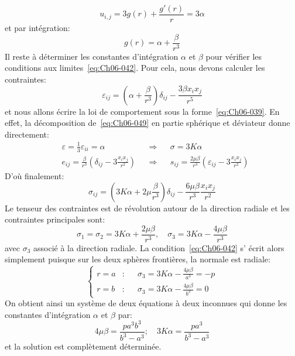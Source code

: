 \begin{equation}
    u_{i,j} = 3 g(r) + \frac{g'(r)}{r} = 3 \alpha
    \label{eq:Ch06-047}
\end{equation}
et par intégration:
\begin{equation}
    g(r) = \alpha + \frac{\beta}{r^3}
    \label{eq:Ch06-048}
\end{equation}
Il reste à déterminer les constantes d'intégration $\alpha$ et $\beta$ pour vérifier les conditions aux limites~\eqref{eq:Ch06-042}.
Pour cela, nous devons calculer les contraintes:
\begin{equation}
    \varepsilon_{ij} = \left( \alpha + \frac{\beta}{r^3} \right)\delta_{ij} - \frac{3\beta x_i x_j}{r^5}
    \label{eq:Ch06-049}
\end{equation}
et nous allons écrire la loi de comportement sous la forme~\eqref{eq:Ch06-039}.
En effet, la décomposition de~\eqref{eq:Ch06-049} en partie sphérique et déviateur donne directement:
\begin{equation}
    \begin{aligned}
        &\varepsilon = \frac{1}{3} \varepsilon_{ii} = \alpha && \Rightarrow && \sigma = 3K  \alpha \\
        &e_{ij} = \frac{\beta}{r^3} \left( \delta_{ij} - 3 \frac{x_ix_j}{r^2} \right) && \Rightarrow && s_{ij} = \frac{2\mu\beta}{r^3} \left( \varepsilon_{ij} - 3 \frac{x_i x_j}{r^2} \right)
    \end{aligned}
    \label{eq:Ch06-050}
\end{equation}
D'où finalement:
\begin{equation}
    \sigma_{ij} = \left( 3K\alpha + 2\mu \frac{\beta}{r^3} \right) \delta_{ij} - \frac{6\mu\beta}{r^3} \frac{x_ix_j}{r^2}
    \label{eq:Ch06-051}
\end{equation}
Le tenseur des contraintes est de révolution autour de la direction radiale et les contraintes principales sont:
\begin{equation}
    \sigma_1 = \sigma_2 = 3 K \alpha + \frac{2\mu\beta}{r^3}, \quad \sigma_3 = 3 K \alpha - \frac{4\mu\beta}{r^3}
    \label{eq:Ch06-052}
\end{equation}
avec $\sigma_3$ associé à la direction radiale.
La condition~\eqref{eq:Ch06-042} s' écrit alors simplement puisque sur les deux sphères frontières, la normale est radiale:
\begin{equation}
    \left\{
    \begin{aligned}
        r=a & : && \sigma_3 = 3K\alpha - \frac{4\mu\beta}{a^3} = -p \\
        r=b & : && \sigma_3 = 3K\alpha - \frac{4\mu\beta}{b^3} = 0
    \end{aligned}
    \right.
    \label{eq:Ch06-053}
\end{equation}
On obtient ainsi un système de deux équations à deux inconnues qui donne les constantes d'intégration $\alpha$ et $\beta$ par:
\begin{equation}
    4\mu\beta = \frac{pa^3b^3}{b^3-a^3}; \quad 3K\alpha = \frac{p a^3}{b^3-a^3}
    \label{eq:Ch06-054}
\end{equation}
et la solution est complètement déterminée.

